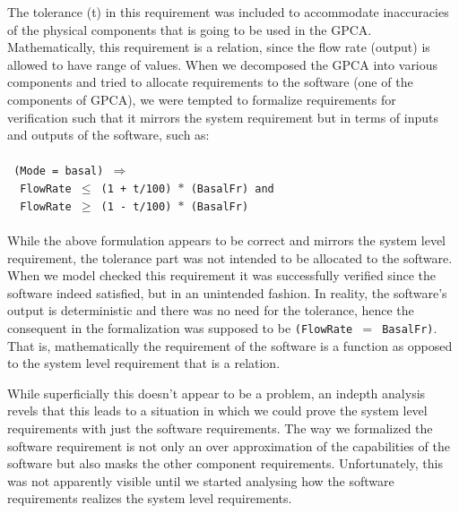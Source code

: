 The tolerance (t) in this requirement was included to accommodate inaccuracies of the physical components that is going to be used in the GPCA. Mathematically, this requirement is a relation, since the flow rate (output) is allowed to have range of values. When we decomposed the GPCA into various components and tried to allocate requirements to the software (one of the components of GPCA), we were tempted to formalize requirements for verification such that it mirrors the system requirement but in terms of inputs and outputs of the software, such as:
\\\\
\footnotesize{\texttt{
(Mode = basal) $\Rightarrow$\\
\textcolor{white}{------}FlowRate $\leq$ (1 + t/100) $\ast$ (BasalFr) and \\
\textcolor{white}{------}FlowRate $\geq$ (1 - t/100) $\ast$ (BasalFr)\\
}}
\normalsize{}\\
While the above formulation appears to be correct and mirrors the system level requirement, the tolerance part was not intended to be allocated to the software. When we model checked this requirement it was successfully verified since the software indeed satisfied, but in an unintended fashion. In reality, the software's output is deterministic and there was no need for the tolerance, hence the consequent in the formalization was supposed to be \texttt{(FlowRate $=$ BasalFr)}. That is, mathematically the requirement of the software is a function as opposed to the system level requirement that is a relation. %

While superficially this doesn't appear to be a problem, an indepth analysis revels that this leads to a situation in which we could prove the system level requirements with just the software requirements. The way we formalized the software requirement is not only an over approximation of the capabilities of the software but also masks the other component requirements. Unfortunately, this was not apparently visible until we started analysing how the software requirements realizes the system level requirements.

